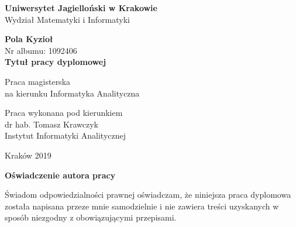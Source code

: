 \documentclass[12pt, oneside]{report}
\begin{document}
  
\thispagestyle{empty}
\begin{titlepage}
    \begin{center}

           \Large
    \textbf{Uniwersytet Jagielloński w Krakowie}\vspace{0.2cm}\\ Wydział Matematyki i Informatyki
               \vspace*{1cm}
               
         \vspace{3cm}
         \Large
          \textbf{Pola Kyzioł}\\\vspace{0.5cm}
         \normalsize Nr albumu: 1092406\\
             \vspace{2cm}
        \Huge
        \textbf{Tytuł pracy dyplomowej}
      
        \vspace{1.5cm}
        \normalsize
        Praca magisterska\\
        na kierunku Informatyka Analityczna\\ \vspace{0.15cm}
        
        \vfill
        \vspace{2cm}
       \begin{minipage}{1\textwidth}
\begin{flushright}
Praca wykonana pod kierunkiem\\
dr hab. Tomasz Krawczyk\\
Instytut Informatyki Analitycznej 
\end{flushright}
\end{minipage}
        
        \vspace{2cm}
        \begin{center}
      Kraków 2019
        \end{center}
    \end{center}
\end{titlepage}

\newpage 
 \thispagestyle{empty}
\vspace{2.5cm}
\begin{flushleft}
\large \textbf{Oświadczenie autora pracy}\vspace{0.6cm}\\
\end{flushleft}

\noindent Świadom odpowiedzialności prawnej oświadczam, że niniejsza praca dyplomowa została napisana przeze mnie samodzielnie i nie zawiera treści uzyskanych w sposób niezgodny z obowiązującymi przepisami.\\
\end{document}
